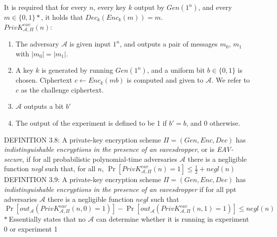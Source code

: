 It is required that for every $n$, every key $k$ output by $Gen(1^n)$, 
and every $m \in \{0,1\}\ast$, it holds that $Dec_k(Enc_k(m)) = m$.\\

$PrivK^{eav}_{\mathcal{A},\Pi}(n)$: 
\begin{enumerate}
    \item The adversary $\mathcal{A}$ is given input $1^n$, and outputs a
     pair of messages $m_0$, $m_1$ with $|m_0| = |m_1|$.
    \item A key $k$ is generated by running $Gen(1^n)$, and a uniform bit
     $b \in \{0,1\}$ is chosen. Ciphertext $c \leftarrow Enc_k(mb)$ is computed
      and given to $\mathcal{A}$. We refer to $c$ as the challenge ciphertext.
    \item $\mathcal{A}$ outputs a bit $b'$
    \item The output of the experiment is defined to be 1 if $b'=b$, and 0
    otherwise.
\end{enumerate}

DEFINITION 3.8: A private-key encryption scheme $\Pi = (Gen, Enc, Dec)$
 has \emph{indistinguishable encryptions in the presence of an eavesdropper}, or 
 is \emph{EAV-secure}, if for all probabilistic polynomial-time adversaries $\mathcal{A}$
 there is a negligible function \emph{negl} such that, for all $n$,
 $\Pr[PrivK^{eav}_{\mathcal{A},\Pi}(n)=1]\le\frac{1}{2}+negl(n)$\\

DEFINITION 3.9: A private-key encryption scheme $\Pi = (Gen, Enc, Dec)$
has \emph{indistinguishable encryptions in the presence of an eavesdropper}
if for all ppt adversaries $\mathcal{A}$ there is a negligible function $negl$ such that
$\Pr[out_{\mathcal{A}}(PrivK^{eav}_{\mathcal{A},\Pi}(n,0)=1)]
-\Pr[out_{\mathcal{A}}(PrivK^{eav}_{\mathcal{A},\Pi}(n,1)=1)]
\le negl(n)$\\
$\ast\ $Essentially states that no $\mathcal{A}$ can determine whether it is running in
experiment 0 or experiment 1\\

